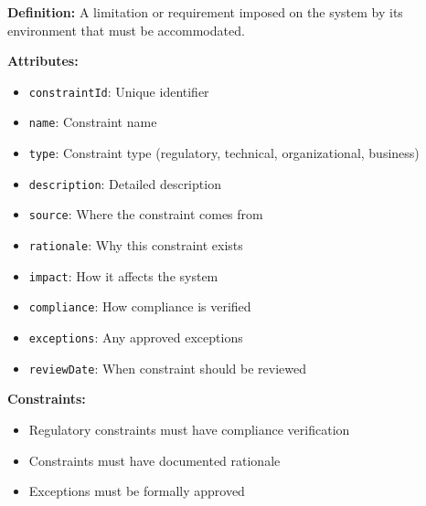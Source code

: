\documentclass[11pt,letterpaper]{article}
\begin{document}
\begin{definitionbox}
\textbf{Definition:} A limitation or requirement imposed on the system by its environment that must be accommodated.

\textbf{Attributes:}
\begin{itemize}[nosep]
    \item \texttt{constraintId}: Unique identifier
    \item \texttt{name}: Constraint name
    \item \texttt{type}: Constraint type (regulatory, technical, organizational, business)
    \item \texttt{description}: Detailed description
    \item \texttt{source}: Where the constraint comes from
    \item \texttt{rationale}: Why this constraint exists
    \item \texttt{impact}: How it affects the system
    \item \texttt{compliance}: How compliance is verified
    \item \texttt{exceptions}: Any approved exceptions
    \item \texttt{reviewDate}: When constraint should be reviewed
\end{itemize}

\textbf{Constraints:}
\begin{itemize}[nosep]
    \item Regulatory constraints must have compliance verification
    \item Constraints must have documented rationale
    \item Exceptions must be formally approved
\end{itemize}
\end{definitionbox}
\end{document}
